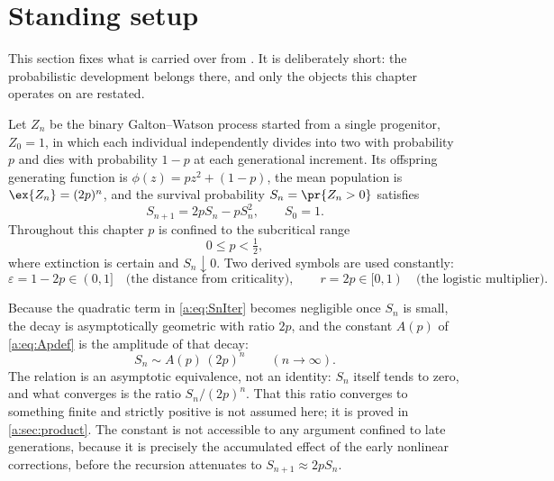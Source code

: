 \section{Standing setup}
\label{a:sec:setup}

This section fixes what is carried over from \ChM. It is deliberately short: the
probabilistic development belongs there, and only the objects this chapter operates
on are restated.

Let $Z_n$ be the binary Galton--Watson process started from a single progenitor,
$Z_0=1$, in which each individual independently divides into two with probability
$p$ and dies with probability $1-p$ at each generational increment. Its offspring
generating function is $\phi(z) = pz^2+(1-p)$, the mean population is
$\ex{Z_n} = (2p)^n$, and the survival probability $S_n = \pr{Z_n>0}$ satisfies
\begin{equation}
\label{a:eq:SnIter}
S_{n+1} = 2pS_n - pS_n^2,\qquad S_0 = 1 .
\end{equation}
Throughout this chapter $p$ is confined to the subcritical range
\begin{equation}
\label{a:eq:range}
0\le p<\tfrac12,
\end{equation}
where extinction is certain and $S_n\downarrow0$. Two derived symbols are used
constantly:
\begin{equation}
\label{a:eq:epsr}
\varepsilon = 1-2p\in(0,1] \quad\text{(the distance from criticality)},
\qquad
r = 2p\in[0,1) \quad\text{(the logistic multiplier)} .
\end{equation}

Because the quadratic term in \cref{a:eq:SnIter} becomes negligible once $S_n$ is
small, the decay is asymptotically geometric with ratio $2p$, and the constant
$A(p)$ of \cref{a:eq:Apdef} is the amplitude of that decay:
\begin{equation}
\label{a:eq:lateS}
S_n\sim A(p)\,(2p)^n\qquad(n\to\infty) .
\end{equation}
The relation is an asymptotic equivalence, not an identity: $S_n$ itself tends to
zero, and what converges is the ratio $S_n/(2p)^n$. That this ratio converges to
something finite and strictly positive is not assumed here; it is proved in
\cref{a:sec:product}. The constant is not accessible to any argument confined to
late generations, because it is precisely the accumulated effect of the early
nonlinear corrections, before the recursion attenuates to $S_{n+1}\approx2pS_n$.

